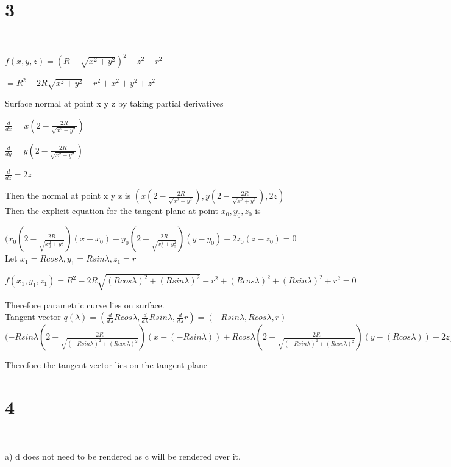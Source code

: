\documentclass[12pt,a4paper]{article}
\begin{document}
\section*{3}
${}$

$f(x,y,z) = (R- \sqrt{x^2 + y ^2})^2 + z^2 - r^2$

$ = R^2 -2R\sqrt{x^2 + y ^2} -r^2 + x^2 + y^2 + z^2$

Surface normal at point x y z by taking partial derivatives

$\frac{d}{dx} = x (2- \frac{2R}{\sqrt{x^2 + y^2}})$ 

$\frac{d}{dy} = y (2- \frac{2R}{\sqrt{x^2 + y^2}})$ 

$\frac{d}{dz} = 2z$

Then the normal at point x y z is $(x (2- \frac{2R}{\sqrt{x^2 + y^2}}), y (2- \frac{2R}{\sqrt{x^2 + y^2}}), 2z )$
\\

Then the explicit equation for the tangent plane at point $x_0, y_0, z_0$ is

$(x_0 (2- \frac{2R}{\sqrt{x_0^2 + y_0^2}})(x-x_0) + y_0 (2- \frac{2R}{\sqrt{x_0^2 + y_0^2}})(y-y_0)+ 2z_0(z-z_0) = 0$
\\

Let $x_1 = Rcos \lambda, y_1 = Rsin\lambda ,z_1  = r$ 

$f(x_1,y_1,z_1) = R^2 -2R\sqrt{(Rcos\lambda)^2 + (Rsin\lambda)^2} - r^2 + (Rcos\lambda)^2 + (Rsin\lambda)^2 + r^2 = 0$

Therefore parametric curve lies on surface.
\\

Tangent vector $q(\lambda) = (\frac{d}{d\lambda}R cos\lambda, \frac{d}{d\lambda}Rsin\lambda, \frac{d}{d\lambda}r) = (-Rsin\lambda, Rcos\lambda, r)$
\\

$(-Rsin\lambda (2- \frac{2R}{\sqrt{(-Rsin\lambda)^2 + (Rcos\lambda)^2}})(x-(-Rsin\lambda)) + Rcos\lambda (2- \frac{2R}{\sqrt{(-Rsin\lambda)^2 + (Rcos\lambda)^2}})(y-(Rcos\lambda))+ 2z_0(z-r) = 0$

Therefore the tangent vector lies on the tangent plane

\pagebreak

\section*{4}
${}$

a)
d does not need to be rendered as c will be rendered over it.
\\
\end{document}
